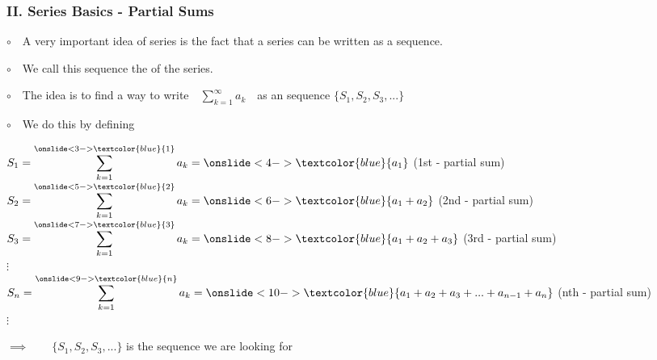 \begin{frame}
\end{frame}

\begin{frame}
\frametitle{II. Series Basics - Partial Sums}
\scriptsize

$\circ$ \,\, A very important idea of series is the fact that a series can be written as a sequence. 

\vspace{0.3cm}

$\circ$ \,\, We call this sequence the \quad{}\quad of the series.

\vspace{0.1cm}

$\circ$ \,\, The idea is to find a way to write \,\, $\displaystyle{\sum \limits_{k = 1}^{\infty} a_k}$ \,\, as an sequence $\displaystyle{\{S_1, S_2, S_3, ...\}}$\\

\vspace{0.1cm}

$\circ$ \,\, We do this by defining 

\qquad $\displaystyle{S_1 = \sum \limits_{k = 1}^{\onslide<3->{\textcolor{blue}{1}}} a_k = \onslide<4->{\textcolor{blue}{a_1}}}$ \hspace{4.4cm}(1st - partial sum) \\
\qquad $\displaystyle{S_2 = \sum \limits_{k = 1}^{\onslide<5->{\textcolor{blue}{2}}} a_k = \onslide<6->{\textcolor{blue}{a_1 + a_2}}}$ \hspace{3.8cm}(2nd - partial sum)\\
\qquad $\displaystyle{S_3 = \sum \limits_{k = 1}^{\onslide<7->{\textcolor{blue}{3}}} a_k = \onslide<8->{\textcolor{blue}{a_1 + a_2 + a_3}}}$ \hspace{3.2cm}(3rd - partial sum)\\
\qquad \quad $\displaystyle{\vdots}$\\
\qquad $\displaystyle{S_n = \sum \limits_{k = 1}^{\onslide<9->{\textcolor{blue}{n}}} a_k = \onslide<10->{\textcolor{blue}{a_1 + a_2 + a_3 + ... + a_{n-1} + a_n}}}$ \hspace{1.0cm}(nth - partial sum)\\
\qquad \quad $\displaystyle{\vdots}$ \\

\vspace{0.2cm}

\qquad $\implies \qquad \{S_1, S_2, S_3, ... \}$ \qquad is the sequence we are looking for

\end{frame}

